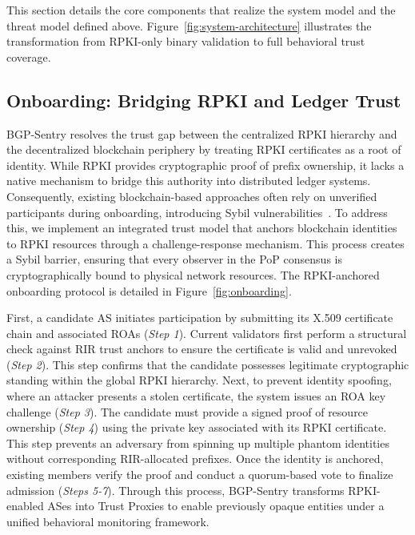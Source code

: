 \documentclass[conference]{IEEEtran}
\newcommand{\rj}[1]{{\color{blue}#1}}
\newcommand{\md}[1]{{\color{purple}#1}}
\begin{document}
This section details the core components that realize the system model and the threat model defined above. Figure~\ref{fig:system-architecture} illustrates the transformation from RPKI-only binary validation to full behavioral trust coverage.

\subsection{\rj{Onboarding: Bridging RPKI and Ledger Trust}}

\md{BGP-Sentry resolves the trust gap between the centralized RPKI hierarchy and the decentralized blockchain periphery by treating RPKI certificates as a root of identity. While RPKI provides cryptographic proof of prefix ownership, it lacks a native mechanism to bridge this authority into distributed ledger systems. Consequently, existing blockchain-based approaches often rely on unverified participants during onboarding, introducing Sybil vulnerabilities~\cite{saad2022routechain}. To address this, we implement an integrated trust model that anchors blockchain identities to RPKI resources through a challenge-response mechanism. This process creates a Sybil barrier, ensuring that every observer in the PoP consensus is cryptographically bound to physical network resources. The RPKI-anchored onboarding protocol is detailed in Figure~\ref{fig:onboarding}.}

\md{First, a candidate AS initiates participation by submitting its X.509 certificate chain and associated ROAs (\textit{Step 1}). Current validators first perform a structural check against RIR trust anchors to ensure the certificate is valid and unrevoked (\textit{Step 2}). This step confirms that the candidate possesses legitimate cryptographic standing within the global RPKI hierarchy. Next, to prevent identity spoofing, where an attacker presents a stolen certificate, the system issues an ROA key challenge (\textit{Step 3}). The candidate must provide a signed proof of resource ownership (\textit{Step 4}) using the private key associated with its RPKI certificate. This step prevents an adversary from spinning up multiple phantom identities without corresponding RIR-allocated prefixes.
Once the identity is anchored, existing members verify the proof and conduct a quorum-based vote to finalize admission (\textit{Steps 5-7}). Through this process, BGP-Sentry transforms RPKI-enabled ASes into Trust Proxies to enable previously opaque entities under a unified behavioral monitoring framework. 
}
\end{document}
